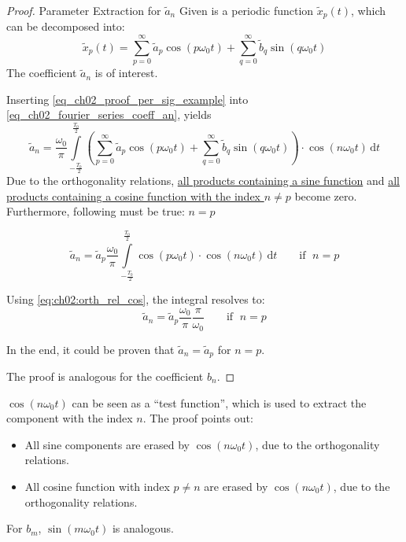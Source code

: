 \begin{refsection}
\begin{proof}{Parameter Extraction for $\tilde{a}_n$}
	Given is a periodic function $\tilde{x}_p(t)$, which can be decomposed into:
	\begin{equation}
		\tilde{x}_p(t) = \sum\limits_{p=0}^{\infty} \tilde{a}_p \cos\left(p \omega_0 t\right) + \sum\limits_{q=0}^{\infty} \tilde{b}_q \sin\left(q \omega_0 t\right)
		\label{eq_ch02_proof_per_sig_example}
	\end{equation}
	The coefficient $\tilde{a}_n$ is of interest.
	
	Inserting \eqref{eq_ch02_proof_per_sig_example} into \eqref{eq_ch02_fourier_series_coeff_an}, yields
	\begin{equation}
		\tilde{a}_n = \frac{\omega_0}{\pi} \int\limits_{-\frac{T_0}{2}}^{\frac{T_0}{2}} \left(\sum\limits_{p=0}^{\infty} \tilde{a}_p \cos\left(p \omega_0 t\right) + \sum\limits_{q=0}^{\infty} \tilde{b}_q \sin\left(q \omega_0 t\right)\right) \cdot \cos\left(n \omega_0 t\right) \, \mathrm{d} t
	\end{equation}
	Due to the orthogonality relations, \underline{all products containing a sine function} and \underline{all products containing a cosine function with the index $n \neq p$} become zero. Furthermore, following must be true: $n = p$
	
	\begin{equation}
		\tilde{a}_n = \tilde{a}_p \frac{\omega_0}{\pi} \int\limits_{-\frac{T_0}{2}}^{\frac{T_0}{2}} \cos\left(p \omega_0 t\right) \cdot \cos\left(n \omega_0 t\right) \, \mathrm{d} t \qquad \text{if } \; n = p
	\end{equation}
	
	Using \eqref{eq:ch02:orth_rel_cos}, the integral resolves to:
	\begin{equation}
		\tilde{a}_n = \tilde{a}_p \frac{\omega_0}{\pi} \frac{\pi}{\omega_0} \qquad \text{if } \; n = p
	\end{equation}
	
	In the end, it could be proven that $\tilde{a}_n = \tilde{a}_p$ for $n = p$.
	
	The proof is analogous for the coefficient $b_n$.
\end{proof}

$\cos\left(n \omega_0 t\right)$ can be seen as a ``test function'', which is used to extract the component with the index $n$. The proof points out:
\begin{itemize}
	\item All sine components are erased by $\cos\left(n \omega_0 t\right)$, due to the orthogonality relations.
	\item All cosine function with index $p \neq n$ are erased by $\cos\left(n \omega_0 t\right)$, due to the orthogonality relations.
\end{itemize}
For $b_m$, $\sin\left(m \omega_0 t\right)$ is analogous.


\end{refsection}

